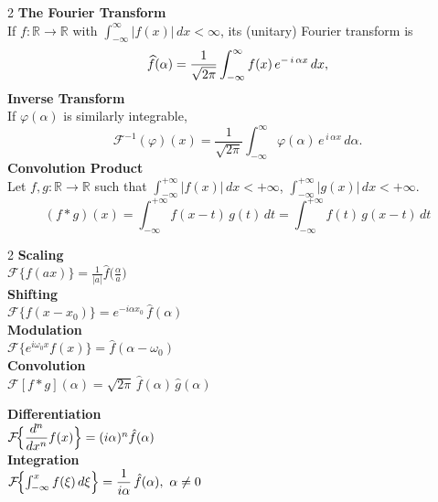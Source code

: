 \documentclass[8pt]{article}
\begin{document}
\begin{multicols}{2}
	\noindent \textbf{The Fourier Transform}\\
	If $f:\mathbb{R}\to\mathbb{R}$ with $\int_{-\infty}^{\infty}\!|f(x)|\,dx<\infty$, its (unitary) Fourier transform is
	\[
		\widehat{f}(\alpha)=\frac{1}{\sqrt{2\pi}}
		\int_{-\infty}^{\infty} f(x)\, e^{-\,i\,\alpha x}\,dx, \vspace{-10px}
	\]
	\noindent \textbf{Inverse Transform}\\
	If $\varphi(\alpha)$ is similarly integrable,
	\[
		\mathcal{F}^{-1}(\varphi)(x)= \frac{1}{\sqrt{2\pi}}
		\int_{-\infty}^{\infty}\!\varphi(\alpha)\,e^{\,i\,\alpha x}\,d\alpha.
	\]
	\noindent \textbf{Convolution Product}\\
	Let \(f,g:\mathbb{R} \to \mathbb{R}\) such that
	\(\int_{-\infty}^{+\infty} |f(x)|\,dx < +\infty\),
	\(\int_{-\infty}^{+\infty} |g(x)|\,dx < +\infty\). \vspace{-5px}
	\[
		(f * g)(x)
		= \int_{-\infty}^{+\infty} f(x - t)\,g(t)\,dt
		= \int_{-\infty}^{+\infty} f(t)\,g(x - t)\,dt
	\]

	\vfill

	\setlength{\columnsep}{-70pt} %
	\hspace{-15px}
	\normalsize
	\begin{minipage}[htp]{0.55\textwidth}
		\begin{multicols}{2}
			\textbf{Scaling} \\
			$\mathcal{F}\{f(ax)\} = \frac{1}{|a|} \hat{f}\!\bigl(\tfrac{\alpha}{a}\bigr)$ \\[4pt]

			\textbf{Shifting} \\
			$\mathcal{F}\{f(x - x_0)\} = e^{-i\alpha x_0}\,\hat{f}(\alpha)$ \\[4pt]

			\textbf{Modulation} \\
			$\mathcal{F}\{e^{i\omega_0 x} f(x)\} = \hat{f}(\alpha - \omega_0)$ \\[4pt]

			\textbf{Convolution} \\
			$\mathcal{F}[f * g](\alpha)
				= \sqrt{2\pi} \,\hat{f}(\alpha)\,\hat{g}(\alpha)$ \\[4pt]
			\columnbreak

			\textbf{Differentiation} \\[2pt]
			$\mathcal{F}\!\Bigl\{\dfrac{d^n}{dx^n}f(x)\Bigr\} = (i\alpha)^n \hat{f}(\alpha)$ \\[4pt]

			\textbf{Integration} \\
			$\mathcal{F}\!\Bigl\{\int_{-\infty}^x f(\xi)\,d\xi\Bigr\}
				= \dfrac{1}{i\alpha}\,\hat{f}(\alpha), \ \alpha \neq 0$ \\[4pt]


\end{multicols}
\end{minipage}
\end{multicols}
\end{document}
